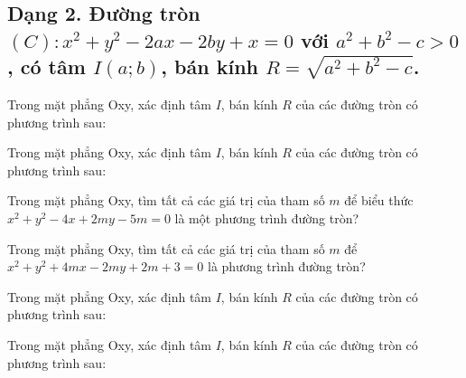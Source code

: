 \documentclass[12pt,a4paper]{book}
\begin{document}
\subsection{Dạng 2. Đường tròn $(C): x^2 + y^2 - 2ax - 2by + x = 0$ với $a^2 + b^2 - c > 0$, có tâm $I(a;b)$, bán kính $R = \sqrt{a^2 + b^2 - c}$.}


\begin{ex}
Trong mặt phẳng Oxy, xác định tâm $I$, bán kính $R$ của các đường tròn có phương trình sau:
\end{ex}

\begin{ex}
Trong mặt phẳng Oxy, xác định tâm $I$, bán kính $R$ của các đường tròn có phương trình sau:
\end{ex}

\begin{ex}
Trong mặt phẳng Oxy, tìm tất cả các giá trị của tham số $m$ để biểu thức $x^2 + y^2 - 4x + 2my - 5m = 0$ là một phương trình đường tròn?
\end{ex}

\begin{ex}
Trong mặt phẳng Oxy, tìm tất cả các giá trị của tham số $m$ để $x^2 + y^2 + 4mx - 2my + 2m + 3 = 0$ là phương trình đường tròn?
\end{ex}

\begin{ex}
Trong mặt phẳng Oxy, xác định tâm $I$, bán kính $R$ của các đường tròn có phương trình sau:
\loigiai{}
\end{ex}

\begin{ex}
Trong mặt phẳng Oxy, xác định tâm $I$, bán kính $R$ của các đường tròn có phương trình sau:
\loigiai{}
\end{ex}
\end{document}
